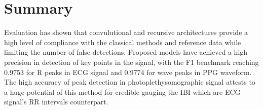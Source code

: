 \documentclass[journal]{IEEEtran}
\begin{document}
\section{Summary}
Evaluation has shown that convulutional and recursive architectures provide a high level of compliance with the classical methods and reference data while limiting the number of false detections. Proposed models have achieved a high precision in detection of key points in the signal, with the F1 benchmark reaching 0.9753 for R peaks in ECG signal and 0.9774 for wave peaks in PPG waveform. The high accuracy of peak detection in photoplethysomographic signal attests to a huge potential of this method for credible gauging the IBI which are ECG signal's RR intervals counterpart.
\end{document}
